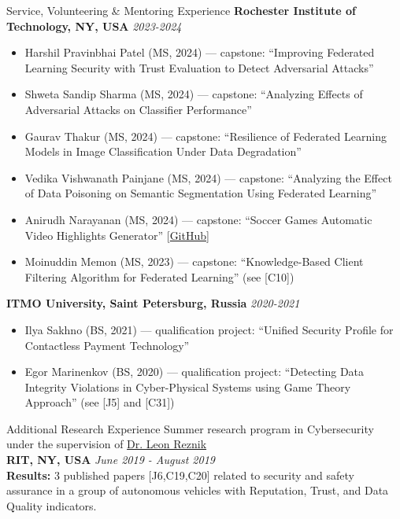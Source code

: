 \documentclass[10pt]{resume} %
\begin{document}
\begin{rSection}{Service, Volunteering \& Mentoring Experience}
\textbf{Rochester Institute of Technology, NY, USA} \hfill\small{\em 2023-2024}\normalsize
\begin{itemize}\itemsep-0.5em
\item Harshil Pravinbhai Patel (MS, 2024) --- capstone: ``Improving Federated Learning Security with Trust Evaluation to Detect Adversarial Attacks''
\item Shweta Sandip Sharma (MS, 2024) --- capstone: ``Analyzing Effects of Adversarial Attacks on Classifier Performance''
\item Gaurav Thakur (MS, 2024) --- capstone: ``Resilience of Federated Learning Models in Image Classification Under Data Degradation''
\item Vedika Vishwanath Painjane (MS, 2024) --- capstone: ``Analyzing the Effect of Data Poisoning on Semantic Segmentation Using Federated Learning''
\item Anirudh Narayanan (MS, 2024) --- capstone: ``Soccer Games Automatic Video Highlights Generator'' [\href{https://github.com/Anirudhrn98/Event_Detection_Soccer}{GitHub}]
\item Moinuddin Memon (MS, 2023) --- capstone: ``Knowledge-Based Client Filtering Algorithm for Federated Learning'' (see [C10])
\end{itemize}

\textbf{ITMO University, Saint Petersburg, Russia} \hfill\small{\em 2020-2021}\normalsize
\begin{itemize}\itemsep-0.5em
\item Ilya Sakhno (BS, 2021) --- qualification project: ``Unified Security Profile for Contactless Payment Technology''
\item Egor Marinenkov (BS, 2020) --- qualification project: ``Detecting Data Integrity Violations in Cyber-Physical Systems using Game Theory Approach'' (see [J5] and [C31])
\end{itemize}

\end{rSection}

\begin{rSection}{Additional Research Experience}
Summer research program in Cybersecurity under the supervision of \href{https://www.rit.edu/directory/lrvcs-leon-reznik}{Dr. Leon Reznik}\\
{\bf RIT, NY, USA} \hfill {\em June 2019 - August 2019}\\ 
\textbf{Results:} 3 published papers [J6,C19,C20] related to security and safety assurance in a group of autonomous vehicles with Reputation, Trust, and Data Quality indicators.\\

\end{rSection}
\end{document}
